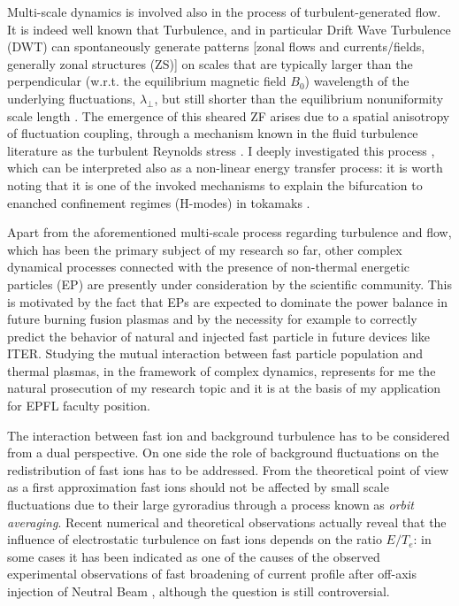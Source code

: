 \documentclass[12pt,a4paper]{article}
\begin{document}
Multi-scale dynamics is involved also in the process of
turbulent-generated flow. It is indeed well known that Turbulence, and
in particular Drift Wave Turbulence (DWT) can spontaneously generate patterns [zonal flows and
currents/fields, generally zonal structures (ZS)] 
on scales that are typically larger than the perpendicular (w.r.t. the
equilibrium magnetic field $B_0$) 
wavelength of the underlying fluctuations, $\lambda_{\perp}$, but
still shorter than the equilibrium nonuniformity scale length
\cite{Hasegawa:1979cp}. 
The emergence of this sheared ZF arises due to a spatial anisotropy of
fluctuation coupling, through a mechanism known in the fluid
turbulence literature as the turbulent Reynolds stress
\cite{Tynan:2009p4426}. I deeply investigated this process \cite{Vianello:2005p1976,Vianello:2006p1149},
which can be interpreted also as a
non-linear energy transfer process: it is worth noting that it is one
of the invoked mechanisms 
to explain the bifurcation to enanched confinement regimes
(H-modes) in tokamaks \cite{Schmitz:2012hwa}. 

Apart from the aforementioned multi-scale process regarding turbulence
and flow, which has been the primary subject of my research so far,
other complex dynamical processes connected with the presence of non-thermal
energetic particles (EP) are presently under consideration by the
scientific community. This is motivated
by the fact that EPs are expected to dominate the power balance in
future burning fusion plasmas \cite{Zonca:2015hs} and by the necessity
for example 
to correctly predict the behavior of natural and injected fast
particle in future devices like ITER. Studying the mutual
interaction between fast particle population and thermal plasmas, in
the framework of complex dynamics, 
represents for me the natural prosecution of my research topic and it
is at the basis of my application for EPFL faculty position. 

The interaction between fast ion and background turbulence has to be
considered from a dual perspective. 
On one side the role of background fluctuations on the
redistribution of fast ions has to be addressed. From the theoretical
point of view as a first approximation fast ions should not be
affected by small scale fluctuations due to their large gyroradius
through a process known as \emph{orbit averaging}. Recent numerical and
theoretical observations \cite{Albergante:2011bj} actually reveal
that the influence of electrostatic turbulence on fast ions depends on the ratio
$E/T_e$: in some cases it has been indicated as one of the causes of
the observed experimental observations of fast broadening of current profile after
off-axis injection of Neutral Beam
\cite{Heidbrink:2009wv,Baranov:2009p4033}, although the question is
still controversial.
\end{document}
